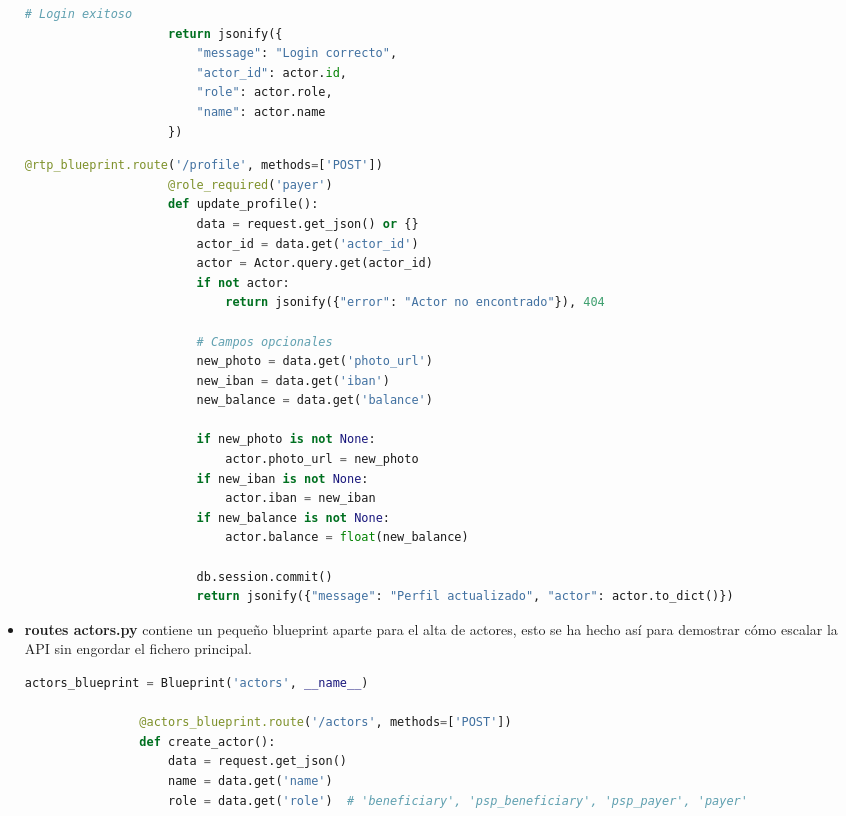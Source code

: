 \begin{itemize}
\begin{lstlisting}[language=Python, style=custom, caption={Endpoint login}]
                    # Login exitoso
                    return jsonify({
                        "message": "Login correcto",
                        "actor_id": actor.id,
                        "role": actor.role,
                        "name": actor.name
                    })
            \end{lstlisting}

            \begin{lstlisting}[language=Python, style=custom, caption={Endpoint profile}]
                    @rtp_blueprint.route('/profile', methods=['POST'])
                    @role_required('payer')
                    def update_profile():
                        data = request.get_json() or {}
                        actor_id = data.get('actor_id')
                        actor = Actor.query.get(actor_id)
                        if not actor:
                            return jsonify({"error": "Actor no encontrado"}), 404

                        # Campos opcionales
                        new_photo = data.get('photo_url')
                        new_iban = data.get('iban')
                        new_balance = data.get('balance')

                        if new_photo is not None:
                            actor.photo_url = new_photo
                        if new_iban is not None:
                            actor.iban = new_iban
                        if new_balance is not None:
                            actor.balance = float(new_balance)

                        db.session.commit()
                        return jsonify({"message": "Perfil actualizado", "actor": actor.to_dict()})

            \end{lstlisting}

    \item \textbf{routes actors.py} contiene un pequeño blueprint aparte para el alta de actores, esto se ha hecho así para demostrar cómo escalar la API sin engordar el fichero principal.
            \begin{lstlisting}[language=Python, style=custom, caption={Declaración blueprint actores}]
                actors_blueprint = Blueprint('actors', __name__)

                @actors_blueprint.route('/actors', methods=['POST'])
                def create_actor():
                    data = request.get_json()
                    name = data.get('name')
                    role = data.get('role')  # 'beneficiary', 'psp_beneficiary', 'psp_payer', 'payer'


\end{lstlisting}
\end{itemize}
